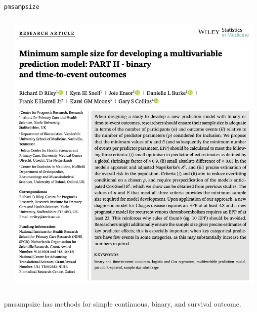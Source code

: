 \documentclass[11pt]{beamer}
\begin{document}
\begin{frame}[t]{\texttt{pmsampsize}}
	\begin{columns}
		\begin{column}[c]{0.5\textwidth}

		\end{column}
		\begin{column}[c]{0.5\textwidth}
			\includegraphics[width=\textwidth]{figures/riley2.png}

		\end{column}
	\end{columns}

	pmsampsize has methods for simple continuous, binary, and survival
	outcome.

\end{frame}
\end{document}
